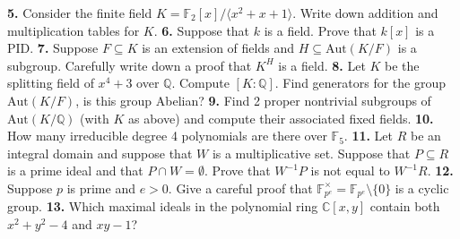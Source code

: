 \documentclass[10pt]{amsart}
\theoremstyle{theorem}
\newcommand{\bF}{\mathbb{F}}
\newcommand{\bQ}{\mathbb{Q}}
\newcommand{\bC}{\mathbb{C}}
\newcommand{\Aut}{\mathrm{Aut}}
\begin{document}
\vskip 275pt
{\bf 5.}  Consider the finite field $K = \bF_2[x]/\langle x^2 + x + 1 \rangle$.  Write down addition and multiplication tables for $K$.  
\newpage
\noindent
{\bf 6.}  Suppose that $k$ is a field.  Prove that $k[x]$ is a PID.
\vskip 275pt
\noindent
{\bf 7.}  Suppose $F \subseteq K$ is an extension of fields and $H \subseteq \Aut(K/F)$ is a subgroup.  Carefully write down a proof that $K^H$ is a field.  
\newpage
\noindent
{\bf 8.}  Let $K$ be the splitting field of $x^4 + 3$ over $\bQ$. Compute $[K : \bQ]$.  Find generators for the group $\Aut(K/F)$, is this group Abelian?  
\vskip 275pt
\noindent
{\bf 9.}  Find 2 proper nontrivial subgroups of $\Aut(K/\bQ)$ (with $K$ as above) and compute their associated fixed fields. 
\newpage
{\bf 10.}  How many irreducible degree 4 polynomials are there over $\bF_5$.  
\vskip 275pt
{\bf 11.}  Let $R$ be an integral domain and suppose that $W$ is a multiplicative set.  Suppose that $P \subseteq R$ is a prime ideal and that $P \cap W = \emptyset$.  Prove that $W^{-1}P$ is not equal to $W^{-1}R$.
\newpage
\noindent
{\bf 12.}  Suppose $p$ is prime and $e > 0$.  Give a careful proof that $\bF_{p^e}^{\times} = \bF_{p^e} \setminus \{0\}$ is a cyclic group.
\vskip 275pt
\noindent
{\bf 13.}  Which maximal ideals in the polynomial ring $\bC[x,y]$ contain both $x^2 + y^2 -4$ and $xy - 1$?
\end{document}
